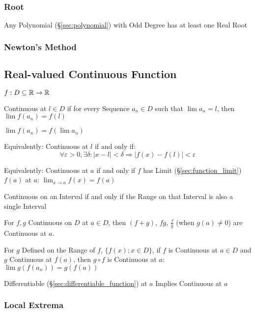 \subsubsection{Root}\label{sec:root}

Any Polynomial (\S\ref{sec:polynomial}) with Odd Degree has at least
one Real Root



\subsubsection{Newton's Method}\label{sec:newtons_method}



\subsection{Real-valued Continuous Function}\label{sec:real_continuous}

$f : D \subseteq \mathbb{R} \rightarrow \mathbb{R}$

Continuous at $l \in D$ if for every Sequence $a_n \in D$ such that
$\lim a_n = l$, then $\lim f(a_n) = f(l)$

$\lim f (a_n) = f (\lim a_n)$

Equivalently: Continuous at $l$ if and only if:
\[
  \forall \varepsilon > 0, \exists \delta :
  |x - l| < \delta \Rightarrow |f(x) - f(l)| < \varepsilon
\]

Equivalently: Continuous at $a$ if and only if $f$ has Limit
(\S\ref{sec:function_limit}) $f(a)$ at $a$: $\lim_{x \rightarrow
  a}f(x) = f(a)$

Continuous on an Interval if and only if the Range on that Interval is
also a single Interval

For $f,g$ Continuous on $D$ at $a \in D$, then $(f + g)$, $f g$,
$\frac{f}{g}$ (when $g(a) \neq 0$) are Continuous at $a$.

For $g$ Defined on the Range of $f$, $\{ f(x); x \in D\}$, if $f$ is
Continuous at $a \in D$ and $g$ Continuous at $f(a)$, then $g \circ f$
is Continuous at $a$: $\lim g(f(a_n)) = g(f(a))$

Differentiable (\S\ref{sec:differentiable_function}) at $a$ Implies
Continuous at $a$



\subsubsection{Local Extrema}\label{sec:local_extrema}

